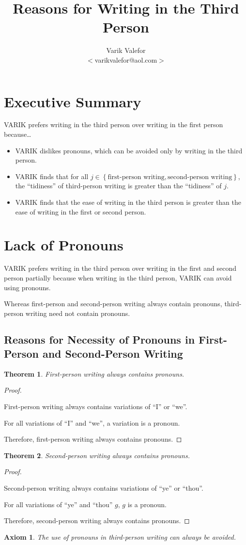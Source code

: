 \documentclass{article}
\title{Reasons for Writing in the Third Person}
\author{Varik Valefor\\{\small $<$varikvalefor@aol.com$>$}}
\newtheorem{thm}{Theorem}
\newtheorem{axiom}{Axiom}
\begin{document}
	\maketitle
	\section{Executive Summary}
		VARIK prefers writing in the third person over writing in the first
		person because\ldots
		\begin{itemize}
			\item VARIK dislikes pronouns, which can be avoided only by
				writing in the third person.
			\item VARIK finds that for all $j \in \left\{\textrm{first-person
				writing}, \textrm{second-person writing}\right\}$, the
				``tidiness'' of third-person writing is greater than the
				``tidiness'' of $j$.
			\item VARIK finds that the ease of writing in the third person is
				greater than the ease of writing in the first or second person.
		\end{itemize}
	\section{Lack of Pronouns}
		VARIK prefers writing in the third person over writing in the first
		and second person partially because when writing in the third
		person, VARIK can avoid using pronouns.

		Whereas first-person and second-person writing always contain
		pronouns, third-person writing need not contain pronouns.
		\subsection{Reasons for Necessity of Pronouns in First-Person and
		Second-Person Writing}
		\begin{thm}
			First-person writing always contains pronouns.
		\end{thm}
		\begin{proof}
			${}$

			First-person writing always contains variations of ``I'' or
			``we''.

			For all variations of ``I'' and ``we'', a variation is a pronoun.

			Therefore, first-person writing always contains pronouns.
		\end{proof}
		\begin{thm}
			Second-person writing always contains pronouns.
		\end{thm}
		\begin{proof}
			${ }$

			Second-person writing always contains variations of ``ye'' or
			``thou''.

			For all variations of ``ye'' and ``thou'' $g$, $g$ is a pronoun.

			Therefore, second-person writing always contains pronouns.
		\end{proof}
		\begin{axiom}
			The use of pronouns in third-person writing can always be avoided.
		\end{axiom}
\end{document}
